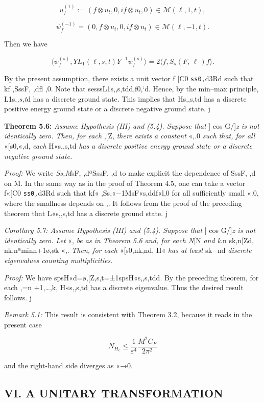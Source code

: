 \documentclass{article}
\begin{document}
$$u_{f}^{(1)}:=(f\otimes u_{t},0,i f\otimes u_{t},0)\in{\mathcal{M}}(\ell,1,t),$$

$$\psi_{f}^{(-1)}{=}(0,f\otimes u_{t},0,i f\otimes u_{t})\in{\mathcal{M}}(\ell,-1,t).$$

Then we have

$$\langle\psi_{f}^{(s)},Y L_{1}(\ell,s,t)Y^{-1}\psi_{f}^{(s)}\rangle=2\langle f,S_{s}(F,\,\ell\,)f\rangle.$$

By the present assumption, there exists a unit vector f [C0 \verb|ss0,|d3Rd such that kf ,SssF, ,dfl ,0. Note that sesssL1s,,s,tdd,f0,`d. Hence, by the min–max principle, L1s,\textit{,s,t}d has a discrete ground state. This implies that Hs,,s,td has a discrete positive energy ground state or a discrete negative ground state. j

\textbf{Theorem 5.6:} \textit{Assume Hypothesis (III) and (5.4). Suppose that} ] cos G/]\textit{z is not identically zero. Then, for each} ,[Z, \textit{there exists a constant} «,.0 \textit{such that, for all} «[s0,«,d, \textit{each} H«s,,s,td \textit{has a discrete positive energy ground state or a discrete negative ground state.}

\textit{Proof:} We write \textit{Ss,M}sF, ,dªSssF, ,d to make explicit the dependence of SssF, ,d on M. In the same way as in the proof of Theorem 4.5, one can take a vector f«[C0 \verb|ss0,|d3Rd such that kf« ,Ss,«−1MsF«s,ddf«l,0 for all sufficiently small «.0, where the smallness depends on ,. It follows from the proof of the preceding theorem that L«s,,s,td has a discrete ground state. j

\textit{Corollary 5.7: Assume Hypothesis (III) and (5.4). Suppose that} ] cos G/]\textit{z is not identically zero. Let} «, \textit{be as in Theorem 5.6 and, for each N}[N \textit{and k}.n sk,n[Zd, nk,nªminn+1ø,øk «,. \textit{Then, for each} «[s0,nk,nd, H« \textit{has at least} sk−nd \textit{discrete eigenvalues counting multiplicities}.

\textit{Proof:} We have spsH«d=ø,[Z,s,t=±1spsH«s,,s,tdd. By the preceding theorem, for each ,=n +1,…,k, H«s,,s,td has a discrete eigenvalue. Thus the desired result follows. j

\textit{Remark 5.1:} This result is consistent with Theorem 3.2, because it reads in the present case

$$N_{H_{e}}\leq\frac{1}{\varepsilon^{4}}\frac{M^{2}C_{F}}{2\pi^{2}}$$

and the right-hand side diverges as «→0.

\subsection{\textbf{VI. A UNITARY TRANSFORMATION}}
\end{document}
